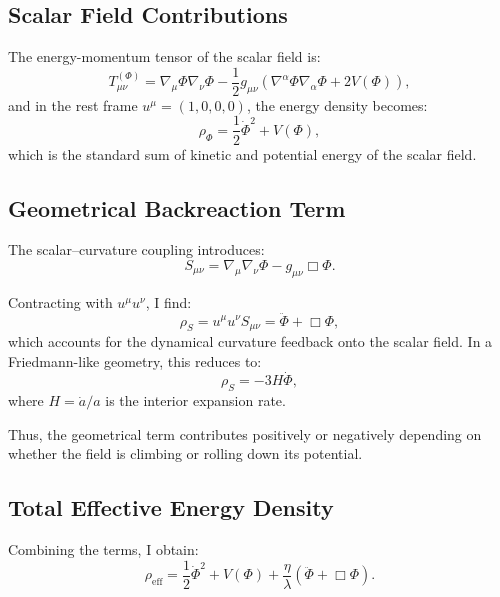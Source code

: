 \documentclass[12pt]{article}
\begin{document}
\subsection{Scalar Field Contributions}

The energy-momentum tensor of the scalar field is:
\begin{equation}
T^{(\Phi)}_{\mu\nu} = \nabla_\mu \Phi \nabla_\nu \Phi - \frac{1}{2} g_{\mu\nu} \left( \nabla^\alpha \Phi \nabla_\alpha \Phi + 2V(\Phi) \right),
\end{equation}
and in the rest frame \( u^\mu = (1, 0, 0, 0) \), the energy density becomes:
\begin{equation}
\rho_{\Phi} = \frac{1}{2} \dot{\Phi}^2 + V(\Phi),
\end{equation}
which is the standard sum of kinetic and potential energy of the scalar field.

\subsection{Geometrical Backreaction Term}

The scalar–curvature coupling introduces:
\begin{equation}
S_{\mu\nu} = \nabla_\mu \nabla_\nu \Phi - g_{\mu\nu} \Box \Phi.
\end{equation}

Contracting with \( u^\mu u^\nu \), I find:
\begin{equation}
\rho_{S} = u^\mu u^\nu S_{\mu\nu} = \ddot{\Phi} + \Box \Phi,
\end{equation}
which accounts for the dynamical curvature feedback onto the scalar field. In a Friedmann-like geometry, this reduces to:
\[
\rho_S = -3H \dot{\Phi},
\]
where \( H = \dot{a}/a \) is the interior expansion rate.

Thus, the geometrical term contributes positively or negatively depending on whether the field is climbing or rolling down its potential.

\subsection{Total Effective Energy Density}

Combining the terms, I obtain:
\begin{equation}
\rho_{\text{eff}} = \frac{1}{2} \dot{\Phi}^2 + V(\Phi) + \frac{\eta}{\lambda} \left( \ddot{\Phi} + \Box \Phi \right).
\end{equation}
\end{document}

